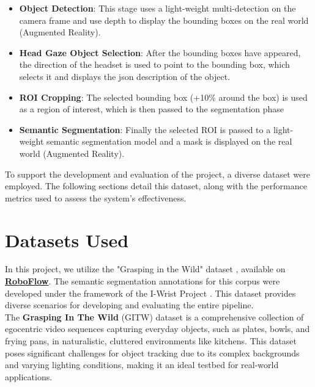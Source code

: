\documentclass{article}
\begin{document}
\begin{itemize}
    \item \textbf{Object Detection}: This stage uses a light-weight multi-detection on the camera frame and use depth to display the bounding boxes on the real world (Augmented Reality).
    
    \item \textbf{Head Gaze Object Selection}: After the bounding boxes have appeared, the direction of the headset is used to point to the bounding box, which selects it and displays the json description of the object.
    
    \item \textbf{ROI Cropping}: The selected bounding box (+10\% around the box) is used as a region of interest, which is then passed to the segmentation phase
    
    \item \textbf{Semantic Segmentation}: Finally the selected ROI is passed to a light-weight semantic segmentation model and a mask is displayed on the real world (Augmented Reality).
\end{itemize}

To support the development and evaluation of the project, a diverse dataset were employed. The following sections detail this dataset, along with the performance metrics used to assess the system's effectiveness.

\section{Datasets Used}

In this project, we utilize the "Grasping in the Wild" dataset \cite{graspinginthewild}, available on \href{https://universe.roboflow.com/iwrist/grasping-in-the-wild}{\textbf{RoboFlow}}. The semantic segmentation annotations for this corpus were developed under the framework of the I-Wrist Project \cite{atoki2024object}. This dataset provides diverse scenarios for developing and evaluating the entire pipeline.\\

The \textbf{Grasping In The Wild} (GITW) dataset is a comprehensive collection of egocentric video sequences capturing everyday objects, such as plates, bowls, and frying pans, in naturalistic, cluttered environments like kitchens. This dataset poses significant challenges for object tracking due to its complex backgrounds and varying lighting conditions, making it an ideal testbed for real-world applications.
\end{document}
